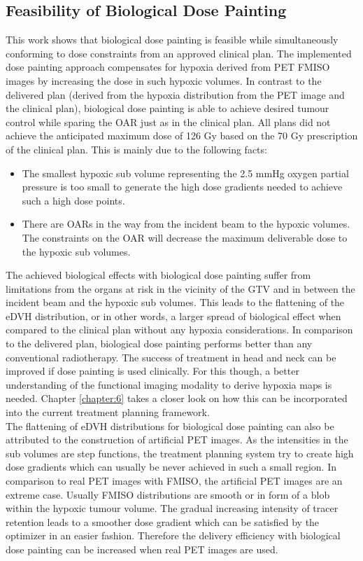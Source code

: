 \subsection{Feasibility of Biological Dose Painting}
This work shows that biological dose painting is feasible while simultaneously conforming to dose constraints from an approved clinical plan. The implemented dose painting approach compensates for hypoxia derived from PET FMISO images by increasing the dose in such hypoxic volumes. In contrast to the delivered plan (derived from the hypoxia distribution from the PET image and the clinical plan), biological dose painting is able to achieve desired tumour control while sparing the OAR just as in the clinical plan. All plans did not achieve the anticipated maximum dose of 126 Gy based on the 70 Gy prescription of the clinical plan. This is mainly due to the following facts:
\begin{itemize}
\item The smallest hypoxic sub volume representing the 2.5 mmHg oxygen partial pressure is too small to generate the high dose gradients needed to achieve such a high dose points.
\item There are OARs in the way from the incident beam to the hypoxic volumes. The constraints on the OAR will decrease the maximum deliverable dose to the hypoxic sub volumes.
\end{itemize} 
The achieved biological effects with biological dose painting suffer from limitations from the organs at risk in the vicinity of the GTV and in between the incident beam and the hypoxic sub volumes. This leads to the flattening of the eDVH distribution, or in other words, a larger spread of biological effect when compared to the clinical plan without any hypoxia considerations. In comparison to the delivered plan, biological dose painting performs better than any conventional radiotherapy. The success of treatment in head and neck can be improved if dose painting is used clinically. For this though, a better understanding of the functional imaging modality to derive hypoxia maps is needed. Chapter \ref{chapter:6} takes a closer look on how this can be incorporated into the current treatment planning framework.\\The flattening of eDVH distributions for biological dose painting can also be attributed to the construction of artificial PET images. As the intensities in the sub volumes are step functions, the treatment planning system try to create high dose gradients which can usually be never achieved in such a small region. In comparison to real PET images with FMISO, the artificial PET images are an extreme case. Usually FMISO distributions are smooth or in form of a blob within the hypoxic tumour volume. The gradual increasing intensity of tracer retention leads to a smoother dose gradient which can be satisfied by the optimizer in an easier fashion. Therefore the delivery efficiency with biological dose painting can be increased when real PET images are used.
